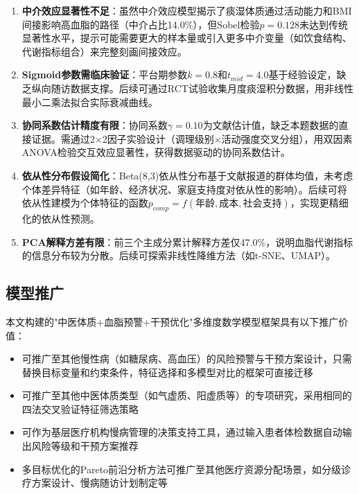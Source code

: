 \documentclass[12pt,a4paper]{ctexart}
\begin{document}
\begin{enumerate}[label=\textbf{\arabic*.}]
    \item \textbf{中介效应显著性不足}：虽然中介效应模型揭示了痰湿体质通过活动能力和BMI间接影响高血脂的路径（中介占比14.0\%），但Sobel检验$p=0.128$未达到传统显著性水平，提示可能需要更大的样本量或引入更多中介变量（如饮食结构、代谢指标组合）来完整刻画间接效应。

    \item \textbf{Sigmoid参数需临床验证}：平台期参数$k=0.8$和$t_{mid}=4.0$基于经验设定，缺乏纵向随访数据支撑。后续可通过RCT试验收集月度痰湿积分数据，用非线性最小二乘法拟合实际衰减曲线。

    \item \textbf{协同系数估计精度有限}：协同系数$\gamma=0.10$为文献估计值，缺乏本题数据的直接证据。需通过2×2因子实验设计（调理级别×活动强度交叉分组），用双因素ANOVA检验交互效应显著性，获得数据驱动的协同系数估计。

    \item \textbf{依从性分布假设简化}：Beta(8,3)依从性分布基于文献报道的群体均值，未考虑个体差异特征（如年龄、经济状况、家庭支持度对依从性的影响）。后续可将依从性建模为个体特征的函数$p_{comp} = f(年龄, 成本, 社会支持)$，实现更精细化的依从性预测。

    \item \textbf{PCA解释方差有限}：前三个主成分累计解释方差仅47.0\%，说明血脂代谢指标的信息分布较为分散。后续可探索非线性降维方法（如t-SNE、UMAP）。
\end{enumerate}

\subsection{模型推广}

本文构建的"中医体质+血脂预警+干预优化"多维度数学模型框架具有以下推广价值：
\begin{itemize}
    \item 可推广至其他慢性病（如糖尿病、高血压）的风险预警与干预方案设计，只需替换目标变量和约束条件，特征选择和多模型对比的框架可直接迁移
    \item 可推广至其他中医体质类型（如气虚质、阳虚质等）的专项研究，采用相同的四法交叉验证特征筛选策略
    \item 可作为基层医疗机构慢病管理的决策支持工具，通过输入患者体检数据自动输出风险等级和干预方案推荐
    \item 多目标优化的Pareto前沿分析方法可推广至其他医疗资源分配场景，如分级诊疗方案设计、慢病随访计划制定等
\end{itemize}
\end{document}

